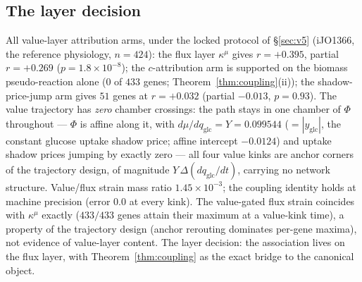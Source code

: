 \documentclass[11pt,a4paper]{article}
\theoremstyle{plain}
\theoremstyle{definition}
\theoremstyle{remark}
\newcommand{\kmu}{\kappa^{\mu}}
\begin{document}
\subsection{The layer decision}
\label{sec:v6}
All value-layer attribution arms, under the locked protocol of \S\ref{sec:v5} (iJO1366, the reference physiology, $n = 424$): the flux layer $\kmu$ gives $r = +0.395$,
partial $r = +0.269$ ($p = 1.8 \times 10^{-8}$); the $c$-attribution
arm is supported on the biomass pseudo-reaction alone ($0$ of $433$
genes; Theorem~\ref{thm:coupling}(ii)); the shadow-price-jump arm
gives $51$ genes at $r = +0.032$ (partial $-0.013$, $p = 0.93$). The
value trajectory has \emph{zero} chamber crossings: the path stays in
one chamber of $\Phi$ throughout --- $\Phi$ is affine along it, with
$d\mu/dq_{\mathrm{glc}} = Y = 0.099544$ ($= |y_{\mathrm{glc}}|$, the
constant glucose uptake shadow price; affine intercept $-0.0124$) and
uptake shadow prices jumping by exactly zero --- all four value kinks
are anchor corners of the trajectory design, of magnitude
$Y\,\Delta(dq_{\mathrm{glc}}/dt)$, carrying no network structure. Value/flux strain mass ratio
$1.45 \times 10^{-3}$; the coupling identity holds at machine
precision (error $0.0$ at every kink). The value-gated flux strain
coincides with $\kmu$ exactly ($433/433$ genes attain their maximum
at a value-kink time), a property of the trajectory design (anchor
rerouting dominates per-gene maxima), not evidence of value-layer
content. The layer decision: the association lives on the flux layer,
with Theorem~\ref{thm:coupling} as the exact bridge to the canonical
object.
\end{document}
